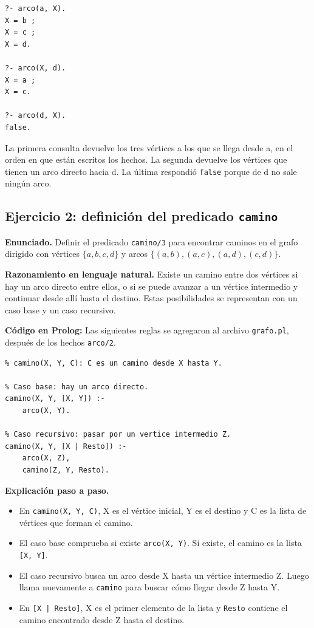 \documentclass[12pt,letterpaper]{article}
\begin{document}
\begin{lstlisting}
?- arco(a, X).
X = b ;
X = c ;
X = d.

?- arco(X, d).
X = a ;
X = c.

?- arco(d, X).
false.
\end{lstlisting}

La primera consulta devuelve los tres vértices a los que se llega desde a, en el
orden en que están escritos los hechos. La segunda devuelve los vértices que tienen
un arco directo hacia d. La última respondió \texttt{false} porque de d no sale
ningún arco.

\subsection{Ejercicio 2: definición del predicado \texttt{camino}}

\noindent\textbf{Enunciado.} Definir el predicado \texttt{camino/3} para encontrar caminos
en el grafo dirigido con vértices $\{a, b, c, d\}$ y arcos
$\{(a, b), (a, c), (a, d), (c, d)\}$.

\noindent\textbf{Razonamiento en lenguaje natural.} Existe un camino entre dos vértices si
hay un arco directo entre ellos, o si se puede avanzar a un vértice intermedio y
continuar desde allí hasta el destino. Estas posibilidades se representan con un
caso base y un caso recursivo.

\noindent\textbf{Código en Prolog:} Las siguientes reglas se agregaron al archivo
\texttt{grafo.pl}, después de los hechos \texttt{arco/2}.

\begin{lstlisting}
% camino(X, Y, C): C es un camino desde X hasta Y.

% Caso base: hay un arco directo.
camino(X, Y, [X, Y]) :-
    arco(X, Y).

% Caso recursivo: pasar por un vertice intermedio Z.
camino(X, Y, [X | Resto]) :-
    arco(X, Z),
    camino(Z, Y, Resto).
\end{lstlisting}

\noindent\textbf{Explicación paso a paso.}
\begin{itemize}
  \item En \texttt{camino(X, Y, C)}, X es el vértice inicial, Y es el destino y C
  es la lista de vértices que forman el camino.
  \item El caso base comprueba si existe \texttt{arco(X, Y)}. Si existe, el camino
  es la lista \texttt{[X, Y]}.
  \item El caso recursivo busca un arco desde X hasta un vértice intermedio Z.
  Luego llama nuevamente a \texttt{camino} para buscar cómo llegar desde Z hasta Y.
  \item En \texttt{[X | Resto]}, X es el primer elemento de la lista y
  \texttt{Resto} contiene el camino encontrado desde Z hasta el destino.
\end{itemize}
\end{document}
